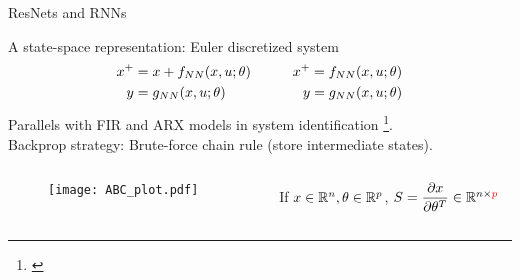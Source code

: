 \documentclass[dvipsnames, 9pt]{beamer}
\begin{document}
\begin{frame}{ResNets and RNNs}
    \begin{block}{A state-space representation: Euler discretized system}
    \begin{align*}
        x^+ &= x + f_{NN} (x, u; \theta) &\qquad x^+ = f_{NN} (x, u; \theta)\notag \\ 
        y &= g_{NN} (x, u; \theta) &\qquad y = g_{NN} (x, u; \theta)
        \label{eq:resrnn}
    \end{align*}
    Parallels with FIR and ARX models in system identification \footnote[frame]{\cite{ljung:1999}}.\\
    Backprop strategy: Brute-force chain rule (store intermediate states).
    \end{block}
    \begin{columns}
    {\begin{column}{0.6\textwidth}
    \begin{figure}
        \centering
        \texttt{[image: ABC\_plot.pdf]}
    \end{figure}
\end{column}}
{\begin{column}{0.3\textwidth}
    \ If $x\in\mathbb{R}^n, \theta\in \mathbb{R}^p$, $S = \dfrac{\partial x}{\partial \theta^T}\in\mathbb{R}^{n\times \textcolor{red}{p}}$
\end{column}}
\end{columns}
\end{frame}
\end{document}

